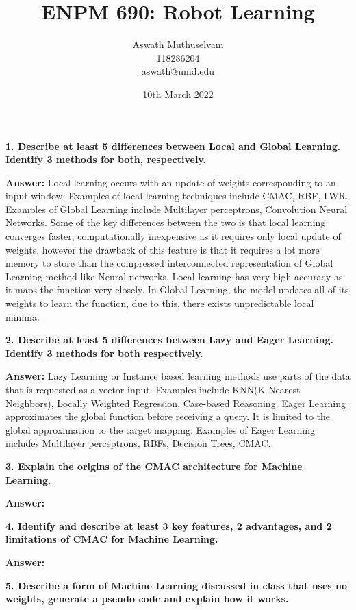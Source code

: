 \documentclass[a4paper, 10pt]{article}
\title{ENPM 690: Robot Learning}
\author{Aswath Muthuselvam \\ 118286204 \\aswath@umd.edu}
\date{10th March 2022}
\begin{document}
\maketitle
{}

\textbf{1. Describe at least 5 differences between Local and Global Learning. Identify 3 methods for both, respectively.}

\textbf{Answer:}
Local learning occurs with an update of weights corresponding to an input window. Examples of local learning techniques include CMAC, RBF, LWR.  
Examples of Global Learning include Multilayer perceptrons, Convolution Neural Networks. Some of the key differences between the two is that local learning converges faster, computationally inexpensive as it requires only local update of weights, however the drawback of this feature is that it requires a lot more memory to store than the compressed interconnected representation of Global Learning method like Neural networks. Local learning has very high accuracy as it maps the function very closely. In Global Learning, the model updates all of its weights to learn the function, due to this, there exists unpredictable local minima.

\hfill

\textbf{2. Describe at least 5 differences between Lazy and Eager Learning. Identify 3 methods for both respectively.}

\textbf{Answer:}
Lazy Learning or Instance based learning methods use parts of the data that is requested as a vector input. Examples include KNN(K-Nearest Neighbors), Locally Weighted Regression, Case-based Reasoning. 
Eager Learning approximates the global function before receiving a query. It is limited to the global approximation to the target mapping. Examples of Eager Learning includes Multilayer perceptrons, RBFs, Decision Trees, CMAC.

\hfill

\textbf{3. Explain the origins of the CMAC architecture for Machine Learning.}

\textbf{Answer:} 


\hfill

\textbf{4. Identify and describe at least 3 key features, 2 advantages, and 2 limitations of CMAC for Machine Learning.}

\textbf{Answer:}


\hfill

\textbf{5. Describe a form of Machine Learning discussed in class that uses no weights, generate a pseudo code and explain how it works.}
\end{document}

